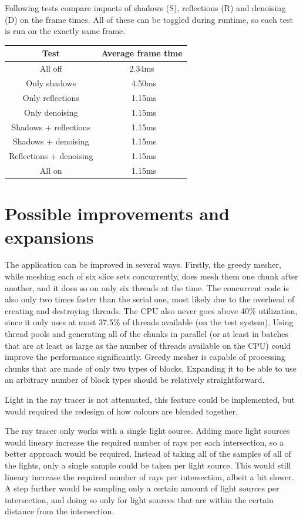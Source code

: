 \documentclass[times, utf8, zavrsni, numeric]{fer}
\begin{document}
Following tests compare impacts of shadows (S), reflections (R) and denoising (D) on the frame times. All of these can be toggled during runtime, so each test is run on the exactly same frame.
\begin{center}
\begin{tabular}{|c|c|}
	\hline
	Test & Average frame time \\
	\hline
	All off &  2.34ms \\
	\hline
	Only shadows & ~4.50ms \\
	\hline
	Only reflections & ~1.15ms \\
	\hline
	Only denoising & ~1.15ms \\
	\hline
	Shadows + reflections & ~1.15ms \\
	\hline
	Shadows + denoising & ~1.15ms \\
	\hline
	Reflections + denoising & ~1.15ms \\
	\hline
	All on & ~1.15ms \\
	\hline
\end{tabular}
\end{center}

\section{Possible improvements and expansions}
The application can be improved in several ways. Firstly, the greedy mesher, while meshing each of six slice sets concurrently, does mesh them one chunk after another, and it does so on only six threads at the time. The concurrent code is also only two times faster than the serial one, most likely due to the overhead of creating and destroying threads. The CPU also never goes above 40\% utilization, since it only uses at most 37.5\% of threads available (on the test system). Using thread pools and generating all of the chunks in parallel (or at least in batches that are at least as large as the number of threads available on the CPU) could improve the performance significantly.
Greedy mesher is capable of processing chunks that are made of only two types of blocks. Expanding it to be able to use an arbitrary number of block types should be relatively straightforward.

Light in the ray tracer is not attenuated, this feature could be implemented, but would required the redesign of how colours are blended together.

The ray tracer only works with a single light source. Adding more light sources would lineary increase the required number of rays per each intersection, so a better approach would be required. Instead of taking all of the samples of all of the lights, only a single sample could be taken per light source. This would still lineary increase the required number of rays per intersection, albeit a bit slower. A step further would be sampling only a certain amount of light sources per intersection, and doing so only for light sources that are within the certain distance from the intersection.
\end{document}
